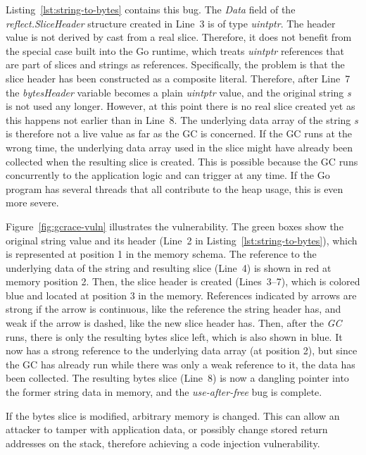 Listing~\ref{lst:string-to-bytes} contains this bug.
The \textit{Data} field of the \textit{reflect.SliceHeader} structure created in Line~3 is of type \textit{uintptr}.
The header value is not derived by cast from a real slice.
Therefore, it does not benefit from the special case built into the Go runtime, which treats \textit{uintptr} references
that are part of slices and strings as references.
Specifically, the problem is that the slice header has been constructed as a composite literal.
Therefore, after Line~7 the \textit{bytesHeader} variable becomes a plain \textit{uintptr} value, and the
original string \textit{s} is not used any longer.
However, at this point there is no real slice created yet as this happens not earlier than in Line~8.
The underlying data array of the string \textit{s} is therefore not a live value as far as the \acrshort{GC} is
concerned.
If the \acrshort{GC} runs at the wrong time, the underlying data array used in the slice might have already been
collected when the resulting slice is created.
This is possible because the \acrshort{GC} runs concurrently to the application logic and can trigger at any time.
If the Go program has several threads that all contribute to the heap usage, this is even more severe.



Figure~\ref{fig:gcrace-vuln} illustrates the vulnerability.
The green boxes show the original string value and its header (Line~2 in Listing~\ref{lst:string-to-bytes}), which is
represented at position 1 in the memory schema.
The reference to the underlying data of the string and resulting slice (Line~4) is shown in red at memory position 2.
Then, the slice header is created (Lines~3--7), which is colored blue and located at position 3 in the memory.
References indicated by arrows are strong if the arrow is continuous, like the reference the string header has, and
weak if the arrow is dashed, like the new slice header has.
Then, after the \textit{GC} runs, there is only the resulting bytes slice left, which is also shown in blue.
It now has a strong reference to the underlying data array (at position 2), but since the \acrshort{GC} has already run
while there was only a weak reference to it, the data has been collected.
The resulting bytes slice (Line~8) is now a dangling pointer into the former string data in memory, and the
\textit{use-after-free} bug is complete.

If the bytes slice is modified, arbitrary memory is changed.
This can allow an attacker to tamper with application data, or possibly change stored return addresses on the stack,
therefore achieving a code injection vulnerability.


